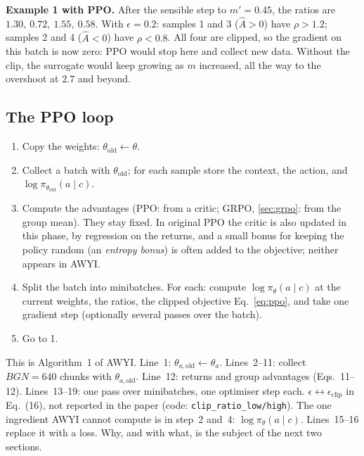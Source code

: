 \documentclass[11pt,a4paper]{article}
\newcommand{\Ah}{\hat A}
\begin{document}
\textbf{Example 1 with PPO.} After the sensible step to $m'=0.45$, the ratios are $1.30,\ 0.72,\ 1.55,\ 0.58$. With $\epsilon=0.2$: samples 1 and 3 ($\Ah>0$) have $\rho>1.2$; samples 2 and 4 ($\Ah<0$) have $\rho<0.8$. All four are clipped, so the gradient on this batch is now zero: PPO would stop here and collect new data. Without the clip, the surrogate would keep growing as $m$ increased, all the way to the overshoot at $2.7$ and beyond.

\subsection{The PPO loop}
\begin{enumerate}
\item Copy the weights: $\theta_{\mathrm{old}}\leftarrow\theta$.
\item Collect a batch with $\theta_{\mathrm{old}}$; for each sample store the context, the action, and $\log\pi_{\theta_{\mathrm{old}}}(a\mid c)$.
\item Compute the advantages (PPO: from a critic; GRPO, \cref{sec:grpo}: from the group mean). They stay fixed. In original PPO the critic is also updated in this phase, by regression on the returns, and a small bonus for keeping the policy random (an \emph{entropy bonus}) is often added to the objective; neither appears in AWYI.
\item Split the batch into minibatches. For each: compute $\log\pi_\theta(a\mid c)$ at the current weights, the ratios, the clipped objective Eq.~\eqref{eq:ppo}, and take one gradient step (optionally several passes over the batch).
\item Go to 1.
\end{enumerate}

\begin{paperlink}
This is Algorithm~1 of AWYI. Line~1: $\theta_{a,\mathrm{old}}\leftarrow\theta_a$. Lines~2--11: collect $BGN=640$ chunks with $\theta_{a,\mathrm{old}}$. Line~12: returns and group advantages (Eqs.~11--12). Lines~13--19: one pass over minibatches, one optimiser step each. $\epsilon\leftrightarrow\epsilon_{\mathrm{clip}}$ in Eq.~(16), not reported in the paper (code: \texttt{clip\_ratio\_low/high}). The one ingredient AWYI cannot compute is in step~2 and~4: $\log\pi_\theta(a\mid c)$. Lines~15--16 replace it with a loss. Why, and with what, is the subject of the next two sections.
\end{paperlink}

\end{document}
